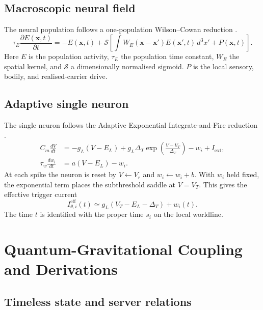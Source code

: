 \subsection{Macroscopic neural field}

The neural population follows a one-population Wilson--Cowan reduction
\citep{wilsoncowan1972}.
\begin{equation}
  \tau_E \frac{\partial E(\mathbf{x},t)}{\partial t}
  = -E(\mathbf{x},t)
  + \mathcal S\left[
      \int W_E(\mathbf{x}-\mathbf{x}')E(\mathbf{x}',t)\,d^3x'
      + P(\mathbf{x},t)
    \right].
  \label{eq:wilsoncowan}
\end{equation}
\noindent Here $E$ is the population activity, $\tau_E$ the population time
constant, $W_E$ the spatial kernel, and $\mathcal S$ a dimensionally normalised
sigmoid. $P$ is the local sensory, bodily, and realised-carrier drive.

\subsection{Adaptive single neuron}

The single neuron follows the Adaptive Exponential Integrate-and-Fire reduction
\citep{hodgkinhuxley1952,brettegerstner2005}.
\begin{align}
  C_m \frac{dV}{dt} &=
    -g_L(V-E_L)
    + g_L\Delta_T\exp\left(\frac{V-V_T}{\Delta_T}\right)
    - w_i + I_{\mathrm{ext}},
  \label{eq:adex_V}\\
  \tau_w \frac{dw_i}{dt} &= a(V-E_L)-w_i.
  \label{eq:adex_w}
\end{align}
\noindent At each spike the neuron is reset by $V\leftarrow V_r$ and
$w_i\leftarrow w_i+b$. With $w_i$ held fixed, the exponential term places the
subthreshold saddle at $V=V_T$. This gives the effective trigger current
\begin{equation}
  I_{\theta,i}^{\mathrm{eff}}(t)
  \simeq g_L(V_T-E_L-\Delta_T)+w_i(t).
  \label{eq:adaptive_trigger}
\end{equation}
\noindent The time $t$ is identified with the proper time $s_i$ on the local
worldline.

\section[Quantum-Gravitational Coupling and Derivations]
{Quantum-Gravitational Coupling\\and Derivations}
\label{app:quantum_coupling}

\subsection{Timeless state and server relations}

